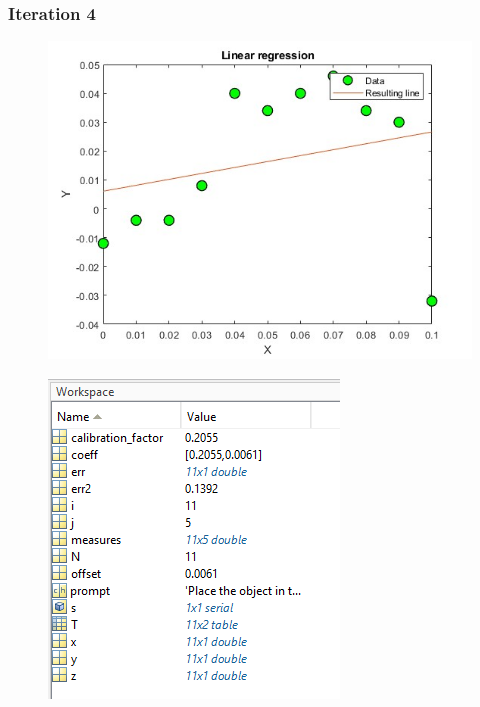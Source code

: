 \subsubsection{Iteration 4}

\begin{figure}[ht]
\centering
\begin{minipage}{.6\textwidth} %
  \centering
  \includegraphics[width=.9\linewidth]{medias/test/calibration/figure_4.jpg}
  \label{fig:test9}
\end{minipage}%
\begin{minipage}{.4\textwidth} %
  \centering
  \includegraphics[width=.9\linewidth]{medias/test/calibration/workspace_4.png}
  \label{fig:test10}
\end{minipage}
\end{figure}


